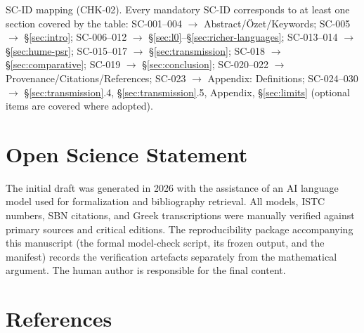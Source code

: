 \documentclass[11pt]{article}
\theoremstyle{plain}
\theoremstyle{definition}
\theoremstyle{remark}
\begin{document}
\noindent SC-ID mapping (CHK-02). Every mandatory SC-ID corresponds to
at least one section covered by the table: SC-001--004 $\to$
Abstract/\"{O}zet/Keywords; SC-005 $\to$ \S\ref{sec:intro}; SC-006--012
$\to$ \S\ref{sec:l0}--\S\ref{sec:richer-languages}; SC-013--014 $\to$
\S\ref{sec:hume-psr}; SC-015--017 $\to$ \S\ref{sec:transmission};
SC-018 $\to$ \S\ref{sec:comparative}; SC-019 $\to$ \S\ref{sec:conclusion};
SC-020--022 $\to$ Provenance/Citations/References; SC-023 $\to$
Appendix: Definitions; SC-024--030 $\to$ \S\ref{sec:transmission}.4,
\S\ref{sec:transmission}.5, Appendix, \S\ref{sec:limits} (optional
items are covered where adopted).

\section*{Open Science Statement}

The initial draft was generated in 2026 with the assistance of an AI
language model used for formalization and bibliography retrieval. All
models, ISTC numbers, SBN citations, and Greek transcriptions were
manually verified against primary sources and critical editions.
The reproducibility package accompanying this manuscript (the formal
model-check script, its frozen output, and the manifest) records the
verification artefacts separately from the mathematical argument.
The human author is responsible for the final content.

\section*{References}
\end{document}
